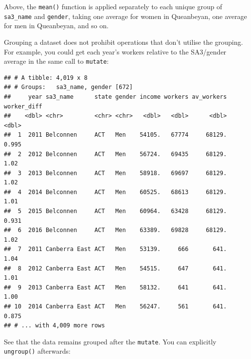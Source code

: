 \documentclass[]{book}
\newenvironment{Shaded}{\begin{snugshade}}{\end{snugshade}}
\newcommand{\DataTypeTok}[1]{\textcolor[rgb]{0.13,0.29,0.53}{#1}}
\newcommand{\KeywordTok}[1]{\textcolor[rgb]{0.13,0.29,0.53}{\textbf{#1}}}
\newcommand{\NormalTok}[1]{#1}
\newcommand{\OperatorTok}[1]{\textcolor[rgb]{0.81,0.36,0.00}{\textbf{#1}}}
\newcommand{\StringTok}[1]{\textcolor[rgb]{0.31,0.60,0.02}{#1}}
\begin{document}
Above, the \texttt{mean()} function is applied separately to each unique group of \texttt{sa3\_name} and \texttt{gender}, taking one average for women in Queanbeyan, one average for men in Queanbeyan, and so on.

Grouping a dataset does not prohibit operations that don't utilise the grouping. For example, you could get each year's workers relative to the SA3/gender average in the same call to \texttt{mutate}:

\begin{Shaded}
\end{Shaded}

\begin{verbatim}
## # A tibble: 4,019 x 8
## # Groups:   sa3_name, gender [672]
##     year sa3_name      state gender income workers av_workers worker_diff
##    <dbl> <chr>         <chr> <chr>   <dbl>   <dbl>      <dbl>       <dbl>
##  1  2011 Belconnen     ACT   Men    54105.   67774     68129.       0.995
##  2  2012 Belconnen     ACT   Men    56724.   69435     68129.       1.02 
##  3  2013 Belconnen     ACT   Men    58918.   69697     68129.       1.02 
##  4  2014 Belconnen     ACT   Men    60525.   68613     68129.       1.01 
##  5  2015 Belconnen     ACT   Men    60964.   63428     68129.       0.931
##  6  2016 Belconnen     ACT   Men    63389.   69828     68129.       1.02 
##  7  2011 Canberra East ACT   Men    53139.     666       641.       1.04 
##  8  2012 Canberra East ACT   Men    54515.     647       641.       1.01 
##  9  2013 Canberra East ACT   Men    58132.     641       641.       1.00 
## 10  2014 Canberra East ACT   Men    56247.     561       641.       0.875
## # ... with 4,009 more rows
\end{verbatim}

See that the data remains grouped after the \texttt{mutate}. You can explicitly \texttt{ungroup()} afterwards:

\begin{Shaded}
\end{Shaded}
\end{document}
